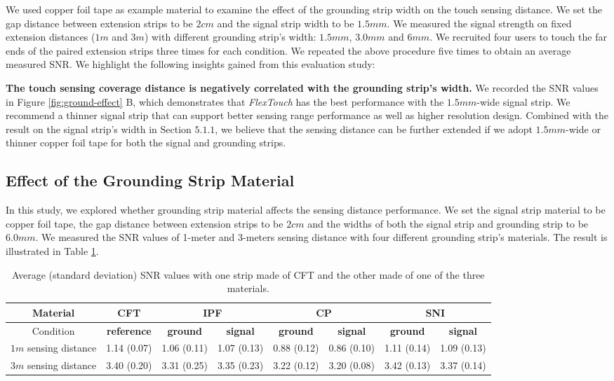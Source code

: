 We used copper foil tape as example material to examine the effect of the grounding strip width on the touch sensing distance. We set the gap distance between extension strips to be $2 cm$ and the signal strip width to be $1.5 mm$. We measured the signal strength on fixed extension distances ($1m$ and $3m$) with different grounding strip's width: $1.5 mm$, $3.0 mm$ and $6 mm$. We recruited four users to touch the far ends of the paired extension strips three times for each condition. We repeated the above procedure five times to obtain an average measured SNR. We highlight the following insights gained from this evaluation study:


\textbf{The touch sensing coverage distance is negatively correlated with the grounding strip's width.} We recorded the SNR values in Figure \ref{fig:ground-effect} B, which demonstrates that \textit{FlexTouch} has the best performance with the $1.5mm$-wide signal strip. We recommend a thinner signal strip that can support better sensing range performance as well as higher resolution design. Combined with the result on the signal strip's width in Section $5.1.1$, we believe that the sensing distance can be further extended if we adopt $1.5 mm$-wide or thinner copper foil tape for both the signal and grounding strips.

\subsection{Effect of the Grounding Strip Material}
In this study, we explored whether grounding strip material affects the sensing distance performance. We set the signal strip material to be copper foil tape, the gap distance between extension strips to be $2 cm$ and the widths of both the signal strip and grounding strip to be $6.0 mm$. We measured the SNR values of 1-meter and 3-meters sensing distance with four different grounding strip's materials. The result is illustrated in Table \ref{tab:gnd-material}.

\begin{table}[ht]
\caption{Average (standard deviation) SNR values with one strip made of CFT and the other made of one of the three materials.}
\vspace{-2mm}
\centering
	\begin{tabular}{|c|c|c|c|c|c|c|c|}
	\hline
	Material &\textbf{CFT} & \multicolumn{2}{c|}{\textbf{IPF}} & \multicolumn{2}{c|}{\textbf{CP}} & \multicolumn{2}{c|}{\textbf{SNI}} \\
	\hline
    Condition & \textbf{reference} & \textbf{ground} & \textbf{signal} & \textbf{ground} & \textbf{signal} & \textbf{ground} & \textbf{signal}  \\
	\hline
	
	$1m$ sensing distance & 1.14 (0.07) & 1.06 (0.11) & 1.07 (0.13) & 0.88 (0.12) & 0.86 (0.10) & 1.11 (0.14) & 1.09 (0.13) \\
	\hline
	$3m$ sensing distance & 3.40 (0.20) & 3.31 (0.25) & 3.35 (0.23) & 3.22 (0.12) & 3.20 (0.08) & 3.42 (0.13) & 3.37 (0.14)   \\
	\hline
	\end{tabular}
	\label{tab:gnd-material}
	
\end{table}

